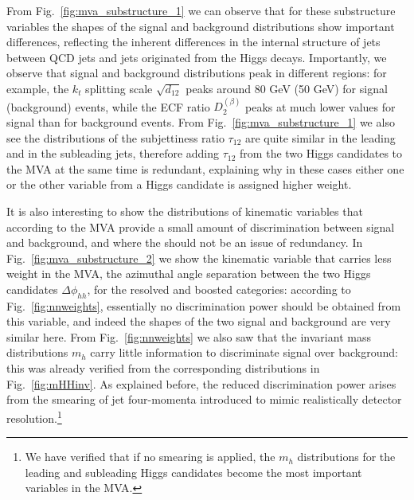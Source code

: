 From Fig.~\ref{fig:mva_substructure_1}
we can observe that for these substructure variables the shapes of the signal
and background distributions show important differences,
reflecting the inherent differences in the internal structure of jets
between QCD jets and jets originated from the Higgs decays.
%
Importantly, we observe that signal and background distributions peak
in different regions: for example, the $k_t$ splitting scale $\sqrt{d_{12}}$
peaks around 80 GeV (50 GeV) for signal (background) events, while
the ECF ratio $D_2^{(\beta)}$ peaks at much lower values for signal than
for background events.
%
From Fig.~\ref{fig:mva_substructure_1} we also see
the distributions of the subjettiness ratio $\tau_{12}$ are quite similar
in the leading and in the subleading jets, therefore adding
$\tau_{12}$ from the two Higgs candidates to the MVA at the same time
is redundant, explaining why in these cases either one or the other
variable from a Higgs candidate is assigned higher weight.


It is also interesting to show the distributions of kinematic variables
that according to the MVA provide a small amount of discrimination
between signal and background, and where the should not be an issue
of redundancy.
%
In Fig.~\ref{fig:mva_substructure_2}
we show the kinematic variable that carries less weight in the MVA,
    the azimuthal angle separation between the two Higgs candidates
    $\Delta\phi_{hh}$, for the resolved and boosted categories:
    according to Fig.~\ref{fig:nnweights}, essentially no discrimination power
    should be obtained from this variable, and indeed the shapes of the two signal
    and background
    are very similar here.
    From Fig.~\ref{fig:nnweights} we also saw that the
    invariant mass distributions $m_h$ carry little information
    to discriminate signal over background:
    this was already verified from 
the corresponding
distributions in Fig.~\ref{fig:mHHinv}.
%
As explained before, the reduced discrimination power arises
from 
the  smearing of jet four-momenta introduced to mimic
realistically detector resolution.\footnote{We have verified that
  if no smearing is applied, the $m_h$ distributions for the leading
  and subleading Higgs candidates become the most
important variables in the MVA.}


